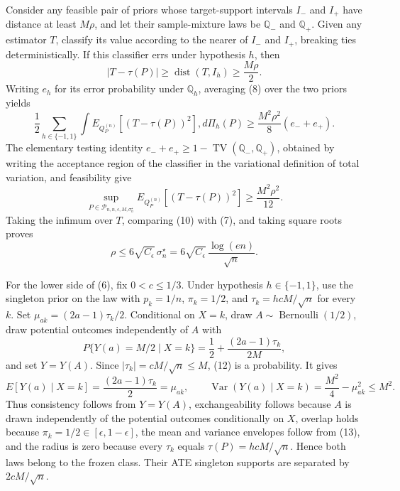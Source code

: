 Consider any feasible pair of priors whose target-support intervals \(I_{-}\) and \(I_{+}\) have distance at least \(M\rho\), and let their sample-mixture laws be \(\mathbb Q_{-}\) and \(\mathbb Q_{+}\).  Given any estimator \(T\), classify its value according to the nearer of \(I_{-}\) and \(I_{+}\), breaking ties deterministically.  If this classifier errs under hypothesis \(h\), then
\[
 |T-\tau(P)|\ge \operatorname{dist}(T,I_h)\ge \frac{M\rho}{2}.         \tag{8}
\]
Writing \(e_h\) for its error probability under \(\mathbb Q_h\), averaging (8) over the two priors yields
\[
 \frac12\sum_{h\in\{-1,1\}}\int
 E_{Q_P^{(n)}}[(T-\tau(P))^2],d\Pi_h(P)
 \ge \frac{M^2\rho^2}{8}(e_{-}+e_{+}).                               \tag{9}
\]
The elementary testing identity \(e_{-}+e_{+}\ge1-\operatorname{TV}(\mathbb Q_{-},\mathbb Q_{+})\), obtained by writing the acceptance region of the classifier in the variational definition of total variation, and feasibility give
\[
 \sup_{P\in\mathcal P_{n,n,\epsilon,M,\sigma_n^\star}}
 E_{Q_P^{(n)}}[(T-\tau(P))^2]
 \ge \frac{M^2\rho^2}{12}.                                           \tag{10}
\]
Taking the infimum over \(T\), comparing (10) with (7), and taking square roots proves
\[
 \rho\le 6\sqrt{C_{\epsilon}}\,\sigma_n^\star
 =6\sqrt{C_{\epsilon}}\,\frac{\log(en)}{\sqrt n}.                  \tag{11}
\]

For the lower side of (6), fix \(0<c\le1/3\).  Under hypothesis \(h\in\{-1,1\}\), use the singleton prior on the law with \(p_k=1/n\), \(\pi_k=1/2\), and \(\tau_k=hcM/\sqrt n\) for every \(k\).  Set \(\mu_{ak}=(2a-1)\tau_k/2\).  Conditional on \(X=k\), draw \(A\sim\operatorname{Bernoulli}(1/2)\), draw potential outcomes independently of \(A\) with
\[
 P\{Y(a)=M/2\mid X=k\}
 =\frac12+\frac{(2a-1)\tau_k}{2M},                                   \tag{12}
\]
and set \(Y=Y(A)\).  Since \(|\tau_k|=cM/\sqrt n\le M\), (12) is a probability.  It gives
\[
 E[Y(a)\mid X=k]=\frac{(2a-1)\tau_k}{2}=\mu_{ak},
 \qquad
 \operatorname{Var}(Y(a)\mid X=k)
 =\frac{M^2}{4}-\mu_{ak}^2\le M^2.                                  \tag{13}
\]
Thus consistency follows from \(Y=Y(A)\), exchangeability follows because \(A\) is drawn independently of the potential outcomes conditionally on \(X\), overlap holds because \(\pi_k=1/2\in[\epsilon,1-\epsilon]\), the mean and variance envelopes follow from (13), and the radius is zero because every \(\tau_k\) equals \(\tau(P)=hcM/\sqrt n\).  Hence both laws belong to the frozen class.  Their ATE singleton supports are separated by \(2cM/\sqrt n\).

